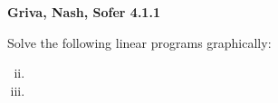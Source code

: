 \textbf{Griva, Nash, Sofer 4.1.1}

Solve the following linear programs graphically:

\begin{enumerate}[(i)]
  \setcounter{enumii}{1}
  \item 
  \pagebreak
  \item 
\end{enumerate}